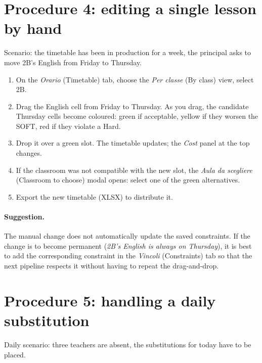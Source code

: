 \section{Procedure 4: editing a single lesson by hand}
\label{sec:wf_edit_manuale}

Scenario: the timetable has been in production for a week, the
principal asks to move 2B's English from Friday to Thursday.

\begin{enumerate}
\item On the \emph{Orario} (Timetable) tab, choose the \emph{Per
  classe} (By class) view, select 2B.
\item Drag the English cell from Friday to Thursday. As you drag,
  the candidate Thursday cells become coloured: green if
  acceptable, yellow if they worsen the SOFT, red if they violate
  a Hard.
\item Drop it over a green slot. The timetable updates; the
  \emph{Cost} panel at the top changes.
\item If the classroom was not compatible with the new slot, the
  \emph{Aula da scegliere} (Classroom to choose) modal opens:
  select one of the green alternatives.
\item Export the new timetable (XLSX) to distribute it.
\end{enumerate}

\paragraph{Suggestion.} The manual change does not automatically
update the saved constraints. If the change is to become permanent
(\emph{2B's English is always on Thursday}), it is best to add the
corresponding constraint in the \emph{Vincoli} (Constraints) tab
so that the next pipeline respects it without having to repeat the
drag-and-drop.


\section{Procedure 5: handling a daily substitution}
\label{sec:wf_supplenza}

Daily scenario: three teachers are absent, the substitutions for
today have to be placed.

